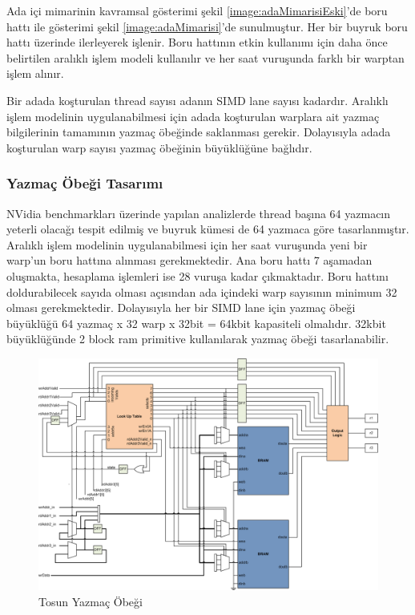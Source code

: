 Ada içi mimarinin kavramsal gösterimi şekil \ref{image:adaMimarisiEski}'de boru hattı ile gösterimi şekil \ref{image:adaMimarisi}'de sunulmuştur. Her bir buyruk boru hattı üzerinde ilerleyerek işlenir. Boru hattının etkin kullanımı için daha önce belirtilen aralıklı işlem modeli kullanılır ve her saat vuruşunda farklı bir warptan işlem alınır. \par
Bir adada koşturulan thread sayısı adanın SIMD lane sayısı kadardır. Aralıklı işlem modelinin uygulanabilmesi için adada koşturulan warplara ait yazmaç bilgilerinin tamamının yazmaç öbeğinde saklanması gerekir. Dolayısıyla adada koşturulan warp sayısı yazmaç öbeğinin büyüklüğüne bağlıdır.\par

\subsubsection{Yazmaç Öbeği Tasarımı}
NVidia benchmarkları üzerinde yapılan analizlerde thread başına 64 yazmacın yeterli olacağı tespit edilmiş ve buyruk kümesi de 64 yazmaca göre tasarlanmıştır. Aralıklı işlem modelinin uygulanabilmesi için her saat vuruşunda yeni bir warp'un boru hattına alınması gerekmektedir. Ana boru hattı 7 aşamadan oluşmakta, hesaplama işlemleri ise 28 vuruşa kadar çıkmaktadır. Boru hattını doldurabilecek sayıda olması açısından ada içindeki warp sayısının minimum 32 olması gerekmektedir. Dolayısıyla her bir SIMD lane için yazmaç öbeği büyüklüğü 64 yazmaç x 32 warp x 32bit = 64kbit kapasiteli olmalıdır. 32kbit büyüklüğünde 2 block ram primitive kullanılarak yazmaç öbeği tasarlanabilir.\par
\begin{figure}[h]
\centering
\shorthandoff{=}
\includegraphics[width=\textwidth]{gorsel/registerFile.png}
\shorthandoff{=}
\caption{Tosun Yazmaç Öbeği}
\label{image:registerFile}
\end{figure}

